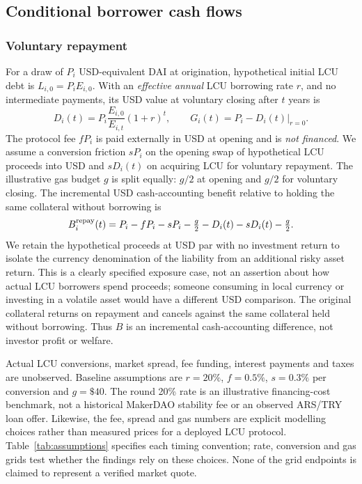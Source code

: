 \documentclass[sn-vancouver,Numbered]{sn-jnl}
\begin{document}
\subsection{Conditional borrower cash flows}
\subsubsection{Voluntary repayment}
For a draw of $P_i$ USD-equivalent DAI at origination, hypothetical initial LCU debt is $L_{i,0}=P_iE_{i,0}$. With an \emph{effective annual} LCU borrowing rate $r$, and no intermediate payments, its USD value at voluntary closing after $t$ years is
\begin{equation}
D_i(t)=P_i\frac{E_{i,0}}{E_{i,t}}(1+r)^t,\qquad
G_i(t)=P_i-D_i(t)\big|_{r=0}.
\label{eq:debt}
\end{equation}
The protocol fee $fP_i$ is paid externally in USD at opening and is \emph{not financed}. We assume a conversion friction $sP_i$ on the opening swap of hypothetical LCU proceeds into USD and $sD_i(t)$ on acquiring LCU for voluntary repayment. The illustrative gas budget $g$ is split equally: $g/2$ at opening and $g/2$ for voluntary closing. The incremental USD cash-accounting benefit relative to holding the same collateral without borrowing is
\begin{equation}
B_i^{\rm repay}(t)=P_i-fP_i-sP_i-\tfrac{g}{2}
-D_i(t)-sD_i(t)-\tfrac{g}{2}.
\label{eq:repay}
\end{equation}
We retain the hypothetical proceeds at USD par with no investment return to isolate the currency denomination of the liability from an additional risky asset return. This is a clearly specified exposure case, not an assertion about how actual LCU borrowers spend proceeds; someone consuming in local currency or investing in a volatile asset would have a different USD comparison. The original collateral returns on repayment and cancels against the same collateral held without borrowing. Thus $B$ is an incremental cash-accounting difference, not investor profit or welfare.

Actual LCU conversions, market spread, fee funding, interest payments and taxes are unobserved. Baseline assumptions are $r=20\%$, $f=0.5\%$, $s=0.3\%$ per conversion and $g=\$40$. The round 20\% rate is an illustrative financing-cost benchmark, not a historical MakerDAO stability fee or an observed ARS/TRY loan offer. Likewise, the fee, spread and gas numbers are explicit modelling choices rather than measured prices for a deployed LCU protocol. Table~\ref{tab:assumptions} specifies each timing convention; rate, conversion and gas grids test whether the findings rely on these choices. None of the grid endpoints is claimed to represent a verified market quote.
\end{document}
